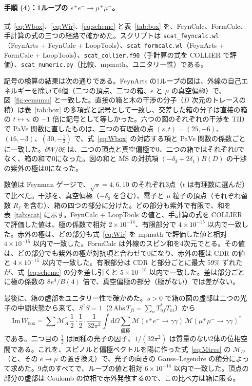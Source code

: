 \documentclass[a4paper,10pt]{ltjsarticle}
\newcommand{\dd}{\mathrm{d}}
\newcommand{\MSbar}{\overline{\mathrm{MS}}}
\begin{document}
\paragraph{手順 (4)：1ループの $e^+e^-\to\mu^+\mu^-$。}式~\eqref{eq:Wbox}、\eqref{eq:Wir}、\eqref{eq:scheme} と表~\ref{tab:box} を、FeynCalc、FormCalc、手計算の式の三つの経路で確かめた。スクリプトは \texttt{scat\_feyncalc.wl}（FeynArts + FeynCalc + LoopTools）、\texttt{scat\_formcalc.wl}（FeynArts + FormCalc + LoopTools）、\texttt{scat\_collier.f90}（手計算の式を COLLIER で評価）、\texttt{scat\_numeric.py}（比較、mpmath、ユニタリー性）である。

記号の検算の結果は次の通りである。FeynArts の1ループの図は、外線の自己エネルギーを除いて6個（二つの頂点、二つの箱、$e$ と $\mu$ の真空偏極）で、図~\ref{fig:eemumu} と一致した。直接の箱と木の干渉の分子（$D$ 次元のトレースの積）は表~\ref{tab:box} の多項式と記号として一致し、交差した箱の分子は直接の箱の $t\leftrightarrow u$ の $-1$ 倍に記号として等しかった。六つの図のそれぞれの干渉を TID で PaVe 関数に直したものは、三つの有理数の点 $(s,t)=(25,-6)$、$(16,-3)$、$(30,-\frac12)$ で、式~\eqref{eq:Wbox} の対応する項と PaVe 関数の係数ごとに一致した。$\partial W/\partial\xi$ は、二つの頂点と真空偏極で0、二つの箱ではそれぞれ0でなく、箱の和で0になった。図の和と $\MSbar$ の対抗項 $(-\delta_3+2\delta_1)B(D)$ の干渉の紫外の極は0になった。

数値は Feynman ゲージで、$\sqrt s=4,6,10$ のそれぞれ3点（$t$ は有理数に選んだ）で比べた。干渉を、真空偏極（$-\delta_3$ を含む）、電子と $\mu$ 粒子の頂点（それぞれ留数 $R_f$ を含む）、箱の四つの部分に分けた。どの部分も紫外で有限で、和を表~\ref{tab:scat} に示す。FeynCalc + LoopTools の値と、手計算の式を COLLIER で評価した値は、極の係数で相対 $2\times10^{-14}$、有限部分で $4\times10^{-15}$ 以内で一致した。赤外の極は、どの部分も式~\eqref{eq:Wir} を mpmath で評価した値と相対 $4\times10^{-15}$ 以内で一致した。FormCalc は外線のスピン和を4次元でとる。その値は、どの部分でも紫外の極が対抗項と合わせて0になり、赤外の極は CDR の値と $4\times10^{-15}$ 以内で一致した。有限部分は CDR と部分ごとに最大 $59\%$ ずれたが、式~\eqref{eq:scheme} の分を差し引くと $5\times10^{-15}$ 以内で一致した。差は部分ごとに極の係数の $8e^4/B(4)$ 倍で、真空偏極の部分（極がない）では差がない。

最後に、箱の虚部をユニタリー性で確かめた。$s>0$ で箱の図の虚部は二つの光子の中間状態から来て、$S^\dagger S=1$（$2\,\mathrm{Abs}\,T_{fi}=\sum_nT_{nf}^*T_{ni}$）から
\begin{equation*}
\mathrm{Im}\,W_{\mathrm{box}}=\sum\mathcal M_A^*\,\frac12\cdot\frac12\cdot\frac{1}{32\pi^2}\int\dd\Omega\sum_{\text{偏極}}\mathcal M(e^+e^-\to\gamma\gamma)\,\mathcal M(\mu^+\mu^-\to\gamma\gamma)^*
\end{equation*}
である。二つ目の $\frac12$ は同種の光子の因子、$1/(32\pi^2)$ は質量のない2体の位相空間である。これを、スピノルと偏極ベクトルを陽に作った式~\eqref{eq:Mtree} の $\mathcal M_D$（と、その $e\to\mu$ の置き換え）で、光子の向きの Gauss--Legendre の積分によって求めた。9点のすべてで、ループの値と相対 $6\times10^{-14}$ 以内で一致した。頂点の部分の虚部は Coulomb の位相で赤外発散するので、この比べ方は箱に限る。
\end{document}
